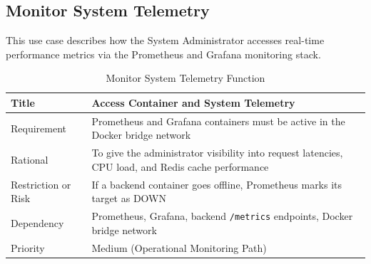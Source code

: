 \clearpage
\subsection{Monitor System Telemetry}
This use case describes how the System Administrator accesses real-time performance metrics via the Prometheus and Grafana monitoring stack.

\begin{table}[h!]
    \begin{tabularx}{\textwidth}{|l|X|}
        \hline
        Title & Access Container and System Telemetry \\
        \hline
        Requirement & Prometheus and Grafana containers must be active in the Docker bridge network \\
        \hline
        Rational & To give the administrator visibility into request latencies, CPU load, and Redis cache performance \\
        \hline
        Restriction or Risk & If a backend container goes offline, Prometheus marks its target as DOWN \\
        \hline
        Dependency & Prometheus, Grafana, backend \texttt{/metrics} endpoints, Docker bridge network \\
        \hline
        Priority & Medium (Operational Monitoring Path) \\
        \hline
    \end{tabularx}
    \caption{Monitor System Telemetry Function}
    \label{tab:table_telemetry_function}
\end{table}

